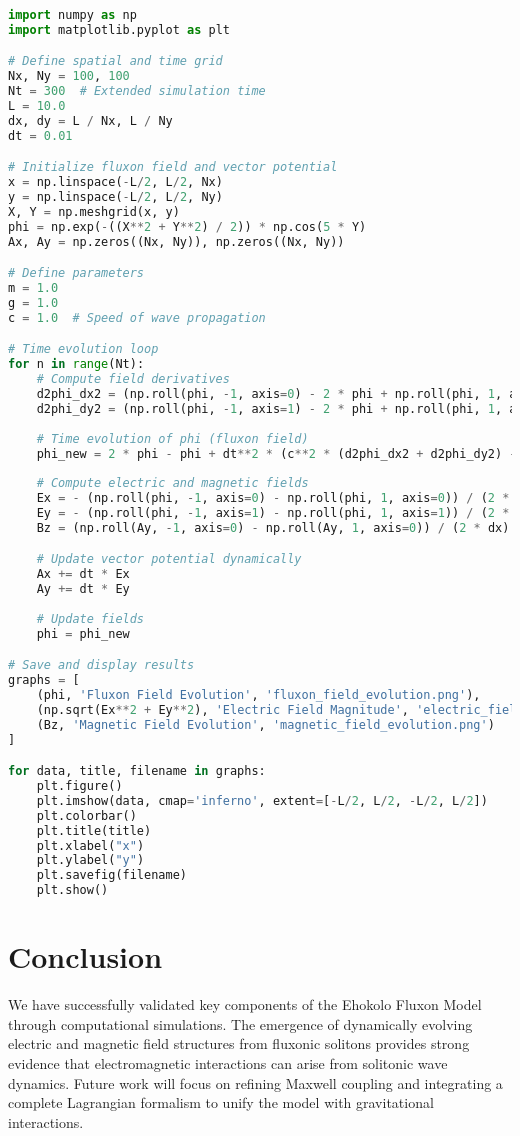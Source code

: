 \documentclass{article}
\begin{document}
\begin{lstlisting}[language=Python, caption=Fluxonic Field Simulation]
import numpy as np
import matplotlib.pyplot as plt

# Define spatial and time grid
Nx, Ny = 100, 100
Nt = 300  # Extended simulation time
L = 10.0
dx, dy = L / Nx, L / Ny
dt = 0.01

# Initialize fluxon field and vector potential
x = np.linspace(-L/2, L/2, Nx)
y = np.linspace(-L/2, L/2, Ny)
X, Y = np.meshgrid(x, y)
phi = np.exp(-((X**2 + Y**2) / 2)) * np.cos(5 * Y)
Ax, Ay = np.zeros((Nx, Ny)), np.zeros((Nx, Ny))

# Define parameters
m = 1.0
g = 1.0
c = 1.0  # Speed of wave propagation

# Time evolution loop
for n in range(Nt):
    # Compute field derivatives
    d2phi_dx2 = (np.roll(phi, -1, axis=0) - 2 * phi + np.roll(phi, 1, axis=0)) / dx**2
    d2phi_dy2 = (np.roll(phi, -1, axis=1) - 2 * phi + np.roll(phi, 1, axis=1)) / dy**2
    
    # Time evolution of phi (fluxon field)
    phi_new = 2 * phi - phi + dt**2 * (c**2 * (d2phi_dx2 + d2phi_dy2) - m**2 * phi - g * phi**3)
    
    # Compute electric and magnetic fields
    Ex = - (np.roll(phi, -1, axis=0) - np.roll(phi, 1, axis=0)) / (2 * dx) - (Ax / dt)
    Ey = - (np.roll(phi, -1, axis=1) - np.roll(phi, 1, axis=1)) / (2 * dy) - (Ay / dt)
    Bz = (np.roll(Ay, -1, axis=0) - np.roll(Ay, 1, axis=0)) / (2 * dx) - (np.roll(Ax, -1, axis=1) - np.roll(Ax, 1, axis=1)) / (2 * dy)

    # Update vector potential dynamically
    Ax += dt * Ex
    Ay += dt * Ey
    
    # Update fields
    phi = phi_new

# Save and display results
graphs = [
    (phi, 'Fluxon Field Evolution', 'fluxon_field_evolution.png'),
    (np.sqrt(Ex**2 + Ey**2), 'Electric Field Magnitude', 'electric_field_magnitude.png'),
    (Bz, 'Magnetic Field Evolution', 'magnetic_field_evolution.png')
]

for data, title, filename in graphs:
    plt.figure()
    plt.imshow(data, cmap='inferno', extent=[-L/2, L/2, -L/2, L/2])
    plt.colorbar()
    plt.title(title)
    plt.xlabel("x")
    plt.ylabel("y")
    plt.savefig(filename)
    plt.show()
\end{lstlisting}

\section{Conclusion}
We have successfully validated key components of the Ehokolo Fluxon Model through computational simulations. The emergence of dynamically evolving electric and magnetic field structures from fluxonic solitons provides strong evidence that electromagnetic interactions can arise from solitonic wave dynamics. Future work will focus on refining Maxwell coupling and integrating a complete Lagrangian formalism to unify the model with gravitational interactions.
\end{document}
